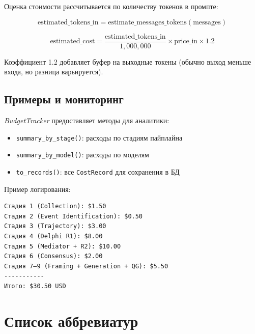 Оценка стоимости рассчитывается по количеству токенов в промпте:

\begin{equation}
\text{estimated\_tokens\_in} = \text{estimate\_messages\_tokens}(\text{messages})
\end{equation}

\begin{equation}
\text{estimated\_cost} = \frac{\text{estimated\_tokens\_in}}{1{,}000{,}000} \times \text{price\_in} \times 1.2
\end{equation}

\noindent Коэффициент 1.2 добавляет буфер на выходные токены (обычно выход меньше входа, но разница варьируется).

\subsection{Примеры и мониторинг}

\emph{BudgetTracker} предоставляет методы для аналитики:

\begin{itemize}[nosep]
\item \texttt{summary\_by\_stage()}: расходы по стадиям пайплайна
\item \texttt{summary\_by\_model()}: расходы по моделям
\item \texttt{to\_records()}: все \texttt{CostRecord} для сохранения в БД
\end{itemize}

Пример логирования:

\begin{verbatim}
Стадия 1 (Collection): $1.50
Стадия 2 (Event Identification): $0.50
Стадия 3 (Trajectory): $3.00
Стадия 4 (Delphi R1): $8.00
Стадия 5 (Mediator + R2): $10.00
Стадия 6 (Consensus): $2.00
Стадия 7–9 (Framing + Generation + QG): $5.50
-----------
Итого: $30.50 USD
\end{verbatim}


\section{Список аббревиатур}

